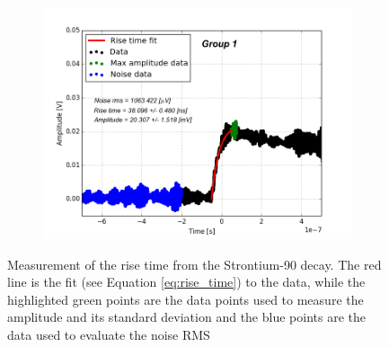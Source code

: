 \documentclass[12pt]{article}
\begin{document}
\begin{figure}[h!]
\begin{subfigure}[t]{0.45\textwidth}
  \end{subfigure}
  \hfill
  \begin{subfigure}[t]{0.45\textwidth}
    \centering
    \includegraphics[width=1.1\textwidth]{./graphics/data_5.png}
  \end{subfigure}
\caption{Measurement of the rise time from the Strontium-90 decay. The red line is the fit (see Equation \ref{eq:rise_time}) to the data, while the highlighted green points are the data points used to measure the amplitude and its standard deviation and the blue points are the data used to evaluate the noise RMS}
\label{fig:rise_time_measurement}
\end{figure}
\end{document}
